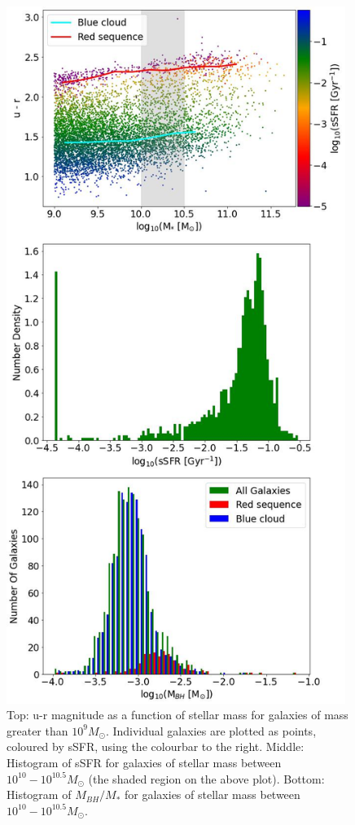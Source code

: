 \documentclass[12pt, twocolumn]{revtex4}    %
\begin{document}
\begin{figure}[H]
\centering
\includegraphics[width=11cm]{Plot_1.jpeg}
\caption{Top: u-r magnitude as a function of stellar mass for galaxies of mass greater than $10^9M_\odot$. Individual galaxies are plotted as points, coloured by sSFR, using the colourbar to the right. Middle: Histogram of sSFR for galaxies of stellar mass between $10^{10} - 10^{10.5}M_\odot$ (the shaded region on the above plot). Bottom: Histogram of $M_{BH}/M_*$ for galaxies of stellar mass between $10^{10} - 10^{10.5}M_\odot$.}
\label{fig:1}
\end{figure}
\twocolumngrid
\end{document}
